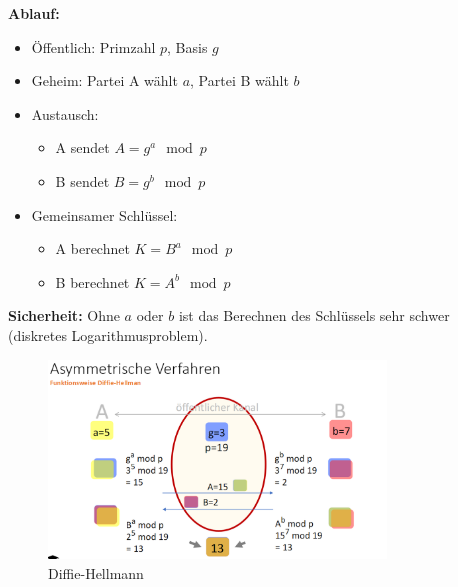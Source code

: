 \documentclass[a4paper,12pt]{article}
\begin{document}
\vspace{0.3em}
\textbf{Ablauf:}
\begin{itemize}
  \item Öffentlich: Primzahl \( p \), Basis \( g \)
  \item Geheim: Partei A wählt \( a \), Partei B wählt \( b \)
  \item Austausch:
    \begin{itemize}
        \item A sendet \( A = g^a \mod p \)
        \item B sendet \( B = g^b \mod p \)
    \end{itemize}
  \item Gemeinsamer Schlüssel:
    \begin{itemize}
        \item A berechnet \( K = B^a \mod p \)
        \item B berechnet \( K = A^b \mod p \)
    \end{itemize}
\end{itemize}

\vspace{0.3em}
\textbf{Sicherheit:} Ohne \( a \) oder \( b \) ist das Berechnen des Schlüssels sehr schwer (diskretes Logarithmusproblem).

\begin{figure}[H]
    \centering
    \includegraphics[width=0.8\textwidth]{bilder/diffie.png}
    \caption{Diffie-Hellmann}
    \label{fig:diffie}
\end{figure}

\begin{table}[h!]
    \centering
    \caption{Vergleich kryptographischer Verfahren}
    \end{table}
    
\end{document}
